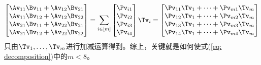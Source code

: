 \documentclass{ctexart}
\begin{document}
\begin{align*}
    \begin{bmatrix}
        \Av_{11} \Bv_{11} + \Av_{12} \Bv_{21} \\
        \Av_{11} \Bv_{12} + \Av_{12} \Bv_{22} \\
        \Av_{21} \Bv_{11} + \Av_{22} \Bv_{21} \\
        \Av_{21} \Bv_{12} + \Av_{22} \Bv_{22}
    \end{bmatrix} = \sum_{i \in [m]}
    \begin{bmatrix}
        \Pv_{i1} \\ \Pv_{i2} \\ \Pv_{i3} \\ \Pv_{i4}
    \end{bmatrix} \Tv_i =
    \begin{bmatrix}
        \Pv_{11} \Tv_1 + \cdots + \Pv_{m1} \Tv_m \\
        \Pv_{12} \Tv_1 + \cdots + \Pv_{m2} \Tv_m \\
        \Pv_{13} \Tv_1 + \cdots + \Pv_{m3} \Tv_m \\
        \Pv_{14} \Tv_1 + \cdots + \Pv_{m4} \Tv_m
    \end{bmatrix}
\end{align*}
只由$\Tv_1, \ldots, \Tv_m$进行加减运算得到。综上，关键就是如何使式(\ref{eq: decomposition})中的$m < 8$。
\end{document}
